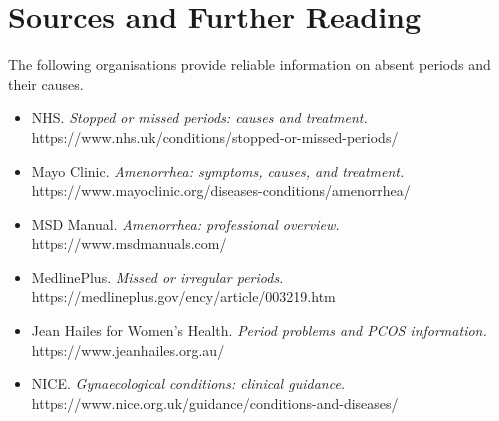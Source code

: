 \section*{Sources and Further Reading}
The following organisations provide reliable information on absent periods and their causes.

\begin{itemize}
    \item NHS. \textit{Stopped or missed periods: causes and treatment.} https://www.nhs.uk/conditions/stopped-or-missed-periods/
    \item Mayo Clinic. \textit{Amenorrhea: symptoms, causes, and treatment.} https://www.mayoclinic.org/diseases-conditions/amenorrhea/
    \item MSD Manual. \textit{Amenorrhea: professional overview.} https://www.msdmanuals.com/
    \item MedlinePlus. \textit{Missed or irregular periods.} https://medlineplus.gov/ency/article/003219.htm
    \item Jean Hailes for Women's Health. \textit{Period problems and PCOS information.} https://www.jeanhailes.org.au/
    \item NICE. \textit{Gynaecological conditions: clinical guidance.} https://www.nice.org.uk/guidance/conditions-and-diseases/
\end{itemize}
